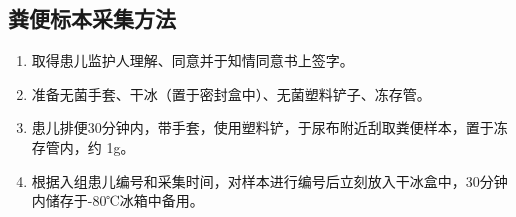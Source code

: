   \subsection{粪便标本采集方法}
  \label{粪便标本采集方法}
    \begin{enumerate}
      \item 取得患儿监护人理解、同意并于知情同意书上签字。
      \item 准备无菌手套、干冰（置于密封盒中）、无菌塑料铲子、冻存管。
      \item 患儿排便30分钟内，带手套，使用塑料铲，于尿布附近刮取粪便样本，置于冻存管内，约 1g。
      \item 根据入组患儿编号和采集时间，对样本进行编号后立刻放入干冰盒中，30分钟内储存于-80℃冰箱中备用。
    \end{enumerate}

